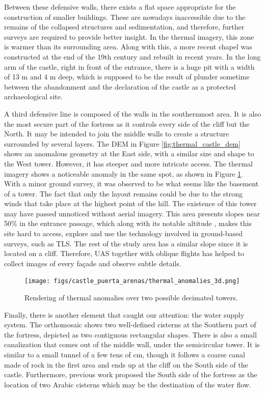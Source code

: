 Between these defensive walls, there exists a flat space appropriate for the construction of smaller buildings. These are nowadays inaccessible due to the remains of the collapsed structures and sedimentation, and therefore, further surveys are required to provide better insight. In the thermal imagery, this zone is warmer than its surrounding area. Along with this, a more recent chapel was constructed at the end of the 19th century and rebuilt in recent years. In the long arm of the castle, right in front of the entrance, there is a huge pit with a width of 13 \si{\meter} and 4 \si{\meter} deep, which is supposed to be the result of plunder sometime between the abandonment and the declaration of the castle as a protected archaeological site. 

A third defensive line is composed of the walls in the southernmost area. It is also the most secure part of the fortress as it controls every side of the cliff but the North. It may be intended to join the middle walls to create a structure surrounded by several layers. The DEM in Figure \ref{fig:thermal_castle_dem} shows an anomalous geometry at the East side, with a similar size and shape to the West tower. However, it has steeper and more intricate access. The thermal imagery shows a noticeable anomaly in the same spot, as shown in Figure \ref{fig:cistern_tower}. With a minor ground survey, it was observed to be what seems like the basement of a tower. The fact that only the layout remains could be due to the strong winds that take place at the highest point of the hill. The existence of this tower may have passed unnoticed without aerial imagery. This area presents slopes near 50\% in the entrance passage, which along with its notable altitude \cite{modrego-fernandez_propuesta_2022}, makes this site hard to access, explore and use the technology involved in ground-based surveys, such as TLS. The rest of the study area has a similar slope since it is located on a cliff. Therefore, UAS together with oblique flights has helped to collect images of every façade and observe subtle details.

\begin{figure}[ht]
    \centering
    \texttt{[image: figs/castle\_puerta\_arenas/thermal\_anomalies\_3d.png]}
    \caption{Rendering of thermal anomalies over two possible decimated towers. }
    \label{fig:cistern_tower}
\end{figure}

Finally, there is another element that caught our attention: the water supply system. The orthomosaic shows two well-defined cisterns at the Southern part of the fortress, depicted as two contiguous rectangular shapes. There is also a small canalization that comes out of the middle wall, under the semicircular tower. It is similar to a small tunnel of a few tens of \si{\centi\meter}, though it follows a coarse canal made of rock in the first area and ends up at the cliff on the South side of the castle. Furthermore, previous work proposed the South side of the fortress as the location of two Arabic cisterns which may be the destination of the water flow.  

